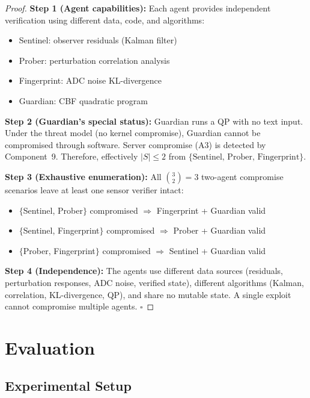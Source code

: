 \documentclass[journal]{IEEEtran}
\begin{document}
\begin{proof}
\textbf{Step 1 (Agent capabilities):} Each agent provides independent verification using different data, code, and algorithms:
\begin{itemize}[leftmargin=*]
\item Sentinel: observer residuals (Kalman filter)
\item Prober: perturbation correlation analysis
\item Fingerprint: ADC noise KL-divergence
\item Guardian: CBF quadratic program
\end{itemize}

\textbf{Step 2 (Guardian's special status):} Guardian runs a QP with no text input. Under the threat model (no kernel compromise), Guardian cannot be compromised through software. Server compromise (A3) is detected by Component~9. Therefore, effectively $|S| \le 2$ from $\{\text{Sentinel, Prober, Fingerprint}\}$.

\textbf{Step 3 (Exhaustive enumeration):} All $\binom{3}{2} = 3$ two-agent compromise scenarios leave at least one sensor verifier intact:
\begin{itemize}[leftmargin=*]
\item $\{$Sentinel, Prober$\}$ compromised $\Rightarrow$ Fingerprint + Guardian valid
\item $\{$Sentinel, Fingerprint$\}$ compromised $\Rightarrow$ Prober + Guardian valid
\item $\{$Prober, Fingerprint$\}$ compromised $\Rightarrow$ Sentinel + Guardian valid
\end{itemize}

\textbf{Step 4 (Independence):} The agents use different data sources (residuals, perturbation responses, ADC noise, verified state), different algorithms (Kalman, correlation, KL-divergence, QP), and share no mutable state. A single exploit cannot compromise multiple agents. $\square$
\end{proof}


\section{Evaluation}
\label{sec:evaluation}

\subsection{Experimental Setup}
\end{document}
